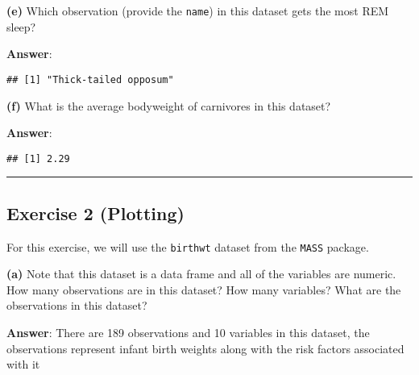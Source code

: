 \documentclass[]{article}
\newenvironment{Shaded}{\begin{snugshade}}{\end{snugshade}}
\newcommand{\KeywordTok}[1]{\textcolor[rgb]{0.13,0.29,0.53}{\textbf{#1}}}
\newcommand{\DataTypeTok}[1]{\textcolor[rgb]{0.13,0.29,0.53}{#1}}
\newcommand{\StringTok}[1]{\textcolor[rgb]{0.31,0.60,0.02}{#1}}
\newcommand{\OtherTok}[1]{\textcolor[rgb]{0.56,0.35,0.01}{#1}}
\newcommand{\OperatorTok}[1]{\textcolor[rgb]{0.81,0.36,0.00}{\textbf{#1}}}
\newcommand{\NormalTok}[1]{#1}
\begin{document}
\textbf{(e)} Which observation (provide the \texttt{name}) in this
dataset gets the most REM sleep?

\textbf{Answer}:

\begin{Shaded}
\end{Shaded}

\begin{verbatim}
## [1] "Thick-tailed opposum"
\end{verbatim}

\textbf{(f)} What is the average bodyweight of carnivores in this
dataset?

\textbf{Answer}:

\begin{Shaded}
\end{Shaded}

\begin{verbatim}
## [1] 2.29
\end{verbatim}

\begin{center}\rule{0.5\linewidth}{\linethickness}\end{center}

\subsection{Exercise 2 (Plotting)}\label{exercise-2-plotting}

For this exercise, we will use the \texttt{birthwt} dataset from the
\texttt{MASS} package.

\textbf{(a)} Note that this dataset is a data frame and all of the
variables are numeric. How many observations are in this dataset? How
many variables? What are the observations in this dataset?

\textbf{Answer}: There are 189 observations and 10 variables in this
dataset, the observations represent infant birth weights along with the
risk factors associated with it
\end{document}
